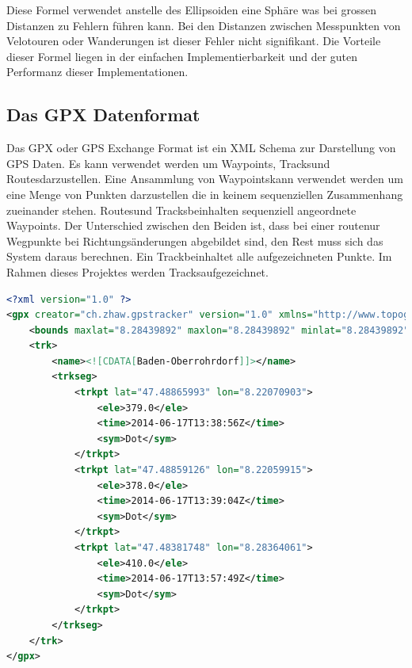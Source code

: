 Diese Formel verwendet anstelle des Ellipsoiden eine Sphäre was bei grossen Distanzen zu Fehlern führen kann. Bei den Distanzen zwischen Messpunkten von Velotouren oder Wanderungen ist dieser Fehler nicht signifikant. Die Vorteile dieser Formel liegen in der einfachen Implementierbarkeit und der guten Performanz dieser Implementationen. 

\subsection{Das GPX Datenformat}
Das GPX oder GPS Exchange Format ist ein XML Schema zur Darstellung von GPS Daten. Es kann verwendet werden um \flqq Waypoints\frqq, \flqq Tracks\frqq und \flqq Routes\frqq darzustellen. Eine Ansammlung von \flqq Waypoints\frqq kann verwendet werden um eine Menge von Punkten darzustellen die in keinem sequenziellen Zusammenhang zueinander stehen. \flqq Routes\frqq und \flqq Tracks\frqq beinhalten sequenziell angeordnete \flqq Waypoints\frqq. Der Unterschied zwischen den Beiden ist, dass bei einer \flqq route\frqq nur Wegpunkte bei Richtungsänderungen abgebildet sind, den Rest muss sich das System daraus berechnen. Ein \flqq Track\frqq beinhaltet alle aufgezeichneten Punkte. Im Rahmen dieses Projektes werden \flqq Tracks\frqq aufgezeichnet. \cite{gpxwiki} \cite{gpx}

\begin{lstlisting}[language=XML, caption={GPX Beispielfile}]
<?xml version="1.0" ?>
<gpx creator="ch.zhaw.gpstracker" version="1.0" xmlns="http://www.topografix.com/GPX/1/0" xmlns:xsi="http://www.w3.org/2001/XMLSchema-instance" xsi:schemaLocation="http://www.topografix.com/GPX/1/0 http://www.topografix.com/GPX/1/0/gpx.xsd">
    <bounds maxlat="8.28439892" maxlon="8.28439892" minlat="8.28439892" minlon="8.28439892"/>
    <trk>
        <name><![CDATA[Baden-Oberrohrdorf]]></name>
        <trkseg>
            <trkpt lat="47.48865993" lon="8.22070903">
                <ele>379.0</ele>
                <time>2014-06-17T13:38:56Z</time>
                <sym>Dot</sym>
            </trkpt>
            <trkpt lat="47.48859126" lon="8.22059915">
                <ele>378.0</ele>
                <time>2014-06-17T13:39:04Z</time>
                <sym>Dot</sym>
            </trkpt>
            <trkpt lat="47.48381748" lon="8.28364061">
                <ele>410.0</ele>
                <time>2014-06-17T13:57:49Z</time>
                <sym>Dot</sym>
            </trkpt>
        </trkseg>
    </trk>
</gpx>
\end{lstlisting}
